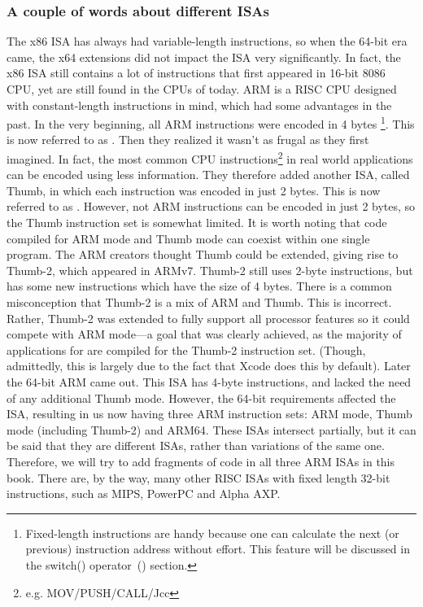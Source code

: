 %
%
%

\subsubsection{A couple of words about different \ac{ISA}s}
The x86 \ac{ISA} has always had variable-length instructions, so when the 64-bit era came, the x64 extensions did not impact the \ac{ISA} very significantly. In fact, the x86 \ac{ISA} still contains a lot of instructions that first appeared in 16-bit 8086 CPU, yet are still found in the CPUs of today.
ARM is a \ac{RISC} \ac{CPU} designed with constant-length instructions in mind, which had some advantages in the past.
In the very beginning, all ARM instructions were encoded in 4 bytes%
\footnote{
Fixed-length instructions are handy because one can calculate the next (or previous)
instruction address without effort. This feature will be discussed in the switch() operator~() section.
}.
This is now referred to as .
Then they realized it wasn't as frugal as they first imagined.
In fact, the most common \ac{CPU} instructions\footnote{e.g. MOV/PUSH/CALL/Jcc} in real world applications can be encoded using less information.
They therefore added another \ac{ISA}, called Thumb, in which each instruction was encoded in just 2 bytes.
This is now referred to as .
However, not  ARM instructions can be encoded in just 2 bytes, so the Thumb instruction set is somewhat limited.
It is worth noting that code compiled for ARM mode and Thumb mode can coexist within one single program.
The ARM creators thought Thumb could be extended, giving rise to Thumb-2, which appeared in ARMv7.
Thumb-2 still uses 2-byte instructions, but has some new instructions which have the size of 4 bytes.
There is a common misconception that Thumb-2 is a mix of ARM and Thumb. This is incorrect.
Rather, Thumb-2 was extended to fully support all processor features so it could
compete with ARM mode---a goal that was clearly achieved, as the majority of applications for \idevices are compiled for the Thumb-2 instruction set. (Though, admittedly, this is largely due to the fact that Xcode does this by default).
Later the 64-bit ARM came out. This \ac{ISA} has 4-byte instructions, and lacked the need of any additional Thumb mode.
However, the 64-bit requirements affected the \ac{ISA}, resulting in us now having three ARM instruction sets: ARM mode, Thumb mode (including Thumb-2) and ARM64.
These \ac{ISA}s intersect partially, but it can be said that they are different \ac{ISA}s, rather than variations of the same one.
Therefore, we will try to add fragments of code in all three ARM \ac{ISA}s in this book.
%
%
%
There are, by the way, many other \ac{RISC} \ac{ISA}s with fixed length 32-bit instructions, such as MIPS, PowerPC and Alpha AXP.
